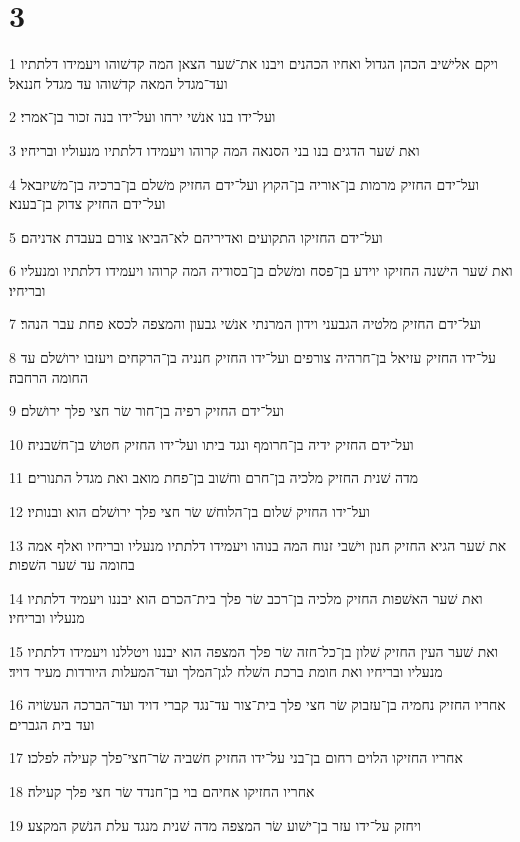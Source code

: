 \chapter{3}

\par 1 ויקם אלישׁיב הכהן הגדול ואחיו הכהנים ויבנו את־שׁער הצאן המה קדשׁוהו ויעמידו דלתתיו ועד־מגדל המאה קדשׁוהו עד מגדל חננאל׃
\par 2 ועל־ידו בנו אנשׁי ירחו ועל־ידו בנה זכור בן־אמרי׃
\par 3 ואת שׁער הדגים בנו בני הסנאה המה קרוהו ויעמידו דלתתיו מנעוליו ובריחיו׃
\par 4 ועל־ידם החזיק מרמות בן־אוריה בן־הקוץ ועל־ידם החזיק משׁלם בן־ברכיה בן־משׁיזבאל ועל־ידם החזיק צדוק בן־בענא׃
\par 5 ועל־ידם החזיקו התקועים ואדיריהם לא־הביאו צורם בעבדת אדניהם׃
\par 6 ואת שׁער הישׁנה החזיקו יוידע בן־פסח ומשׁלם בן־בסודיה המה קרוהו ויעמידו דלתתיו ומנעליו ובריחיו׃
\par 7 ועל־ידם החזיק מלטיה הגבעני וידון המרנתי אנשׁי גבעון והמצפה לכסא פחת עבר הנהר׃
\par 8 על־ידו החזיק עזיאל בן־חרהיה צורפים ועל־ידו החזיק חנניה בן־הרקחים ויעזבו ירושׁלם עד החומה הרחבה׃
\par 9 ועל־ידם החזיק רפיה בן־חור שׂר חצי פלך ירושׁלם׃
\par 10 ועל־ידם החזיק ידיה בן־חרומף ונגד ביתו ועל־ידו החזיק חטושׁ בן־חשׁבניה׃
\par 11 מדה שׁנית החזיק מלכיה בן־חרם וחשׁוב בן־פחת מואב ואת מגדל התנורים׃
\par 12 ועל־ידו החזיק שׁלום בן־הלוחשׁ שׂר חצי פלך ירושׁלם הוא ובנותיו׃
\par 13 את שׁער הגיא החזיק חנון וישׁבי זנוח המה בנוהו ויעמידו דלתתיו מנעליו ובריחיו ואלף אמה בחומה עד שׁער השׁפות׃
\par 14 ואת שׁער האשׁפות החזיק מלכיה בן־רכב שׂר פלך בית־הכרם הוא יבננו ויעמיד דלתתיו מנעליו ובריחיו׃
\par 15 ואת שׁער העין החזיק שׁלון בן־כל־חזה שׂר פלך המצפה הוא יבננו ויטללנו ויעמידו דלתתיו מנעליו ובריחיו ואת חומת ברכת השׁלח לגן־המלך ועד־המעלות היורדות מעיר דויד׃
\par 16 אחריו החזיק נחמיה בן־עזבוק שׂר חצי פלך בית־צור עד־נגד קברי דויד ועד־הברכה העשׂויה ועד בית הגברים׃
\par 17 אחריו החזיקו הלוים רחום בן־בני על־ידו החזיק חשׁביה שׂר־חצי־פלך קעילה לפלכו׃
\par 18 אחריו החזיקו אחיהם בוי בן־חנדד שׂר חצי פלך קעילה׃
\par 19 ויחזק על־ידו עזר בן־ישׁוע שׂר המצפה מדה שׁנית מנגד עלת הנשׁק המקצע׃
